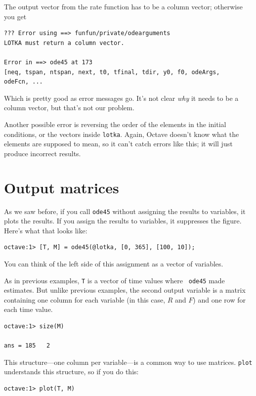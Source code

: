 The output vector from the rate function
has to be a column vector; otherwise you get

\begin{verbatim}
??? Error using ==> funfun/private/odearguments
LOTKA must return a column vector.

Error in ==> ode45 at 173
[neq, tspan, ntspan, next, t0, tfinal, tdir, y0, f0, odeArgs,
odeFcn, ...
\end{verbatim}

Which is pretty good as error messages go. It's not clear {\em why}
it needs to be a column vector, but that's not our problem.

Another possible error is reversing the order of the elements in the
initial conditions, or the vectors inside {\tt lotka}. Again, Octave
doesn't know what the elements are supposed to mean, so it can't catch
errors like this; it will just produce incorrect results.


\section{Output matrices}

As we saw before, if you call {\tt ode45} without assigning the
results to variables, it plots the results. 
If you assign
the results to variables, it suppresses the figure.
Here's what that looks like:

\begin{verbatim}
octave:1> [T, M] = ode45(@lotka, [0, 365], [100, 10]);
\end{verbatim}

You can think of the left side of this assignment as a vector
of variables.

As in previous examples, {\tt T} is a vector of time values where {\tt
ode45} made estimates. But unlike previous examples, the
second output variable is a matrix containing one column for each
variable (in this case, $R$ and $F$) and one row for each time value.

\begin{verbatim}
octave:1> size(M)

ans = 185   2
\end{verbatim}

This structure---one column per variable---is a common way to
use matrices. {\tt plot} understands this structure, so if you
do this:

\begin{verbatim}
octave:1> plot(T, M)
\end{verbatim}

